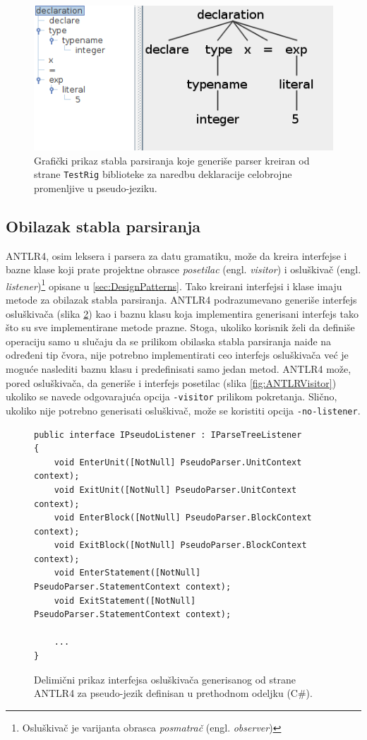 \begin{figure}[h!]
\centering
\includegraphics[scale=0.8]{images/pseudo_parse_tree.png}
\caption{Grafički prikaz stabla parsiranja koje generiše parser kreiran od strane \texttt{TestRig} biblioteke za naredbu deklaracije celobrojne promenljive u pseudo-jeziku.}
\label{fig:PseudoTreeGui}
\end{figure}


\subsection{Obilazak stabla parsiranja}
\label{subsec:ANTLRParserIntegration}

ANTLR4, osim leksera i parsera za datu gramatiku, može da kreira interfejse i bazne klase koji prate projektne obrasce \emph{posetilac} (engl. \emph{visitor}) i osluškivač (engl. \emph{listener})\footnote{Osluškivač je varijanta obrasca \emph{posmatrač} (engl. \emph{observer})} opisane u \ref{sec:DesignPatterns}. Tako kreirani interfejsi i klase imaju metode za obilazak stabla parsiranja. ANTLR4 podrazumevano generiše interfejs osluškivača (slika \ref{fig:ANTLRListener}) kao i baznu klasu koja implementira generisani interfejs tako što su sve implementirane metode prazne. Stoga, ukoliko korisnik želi da definiše operaciju samo u slučaju da se prilikom obilaska stabla parsiranja naiđe na određeni tip čvora, nije potrebno implementirati ceo interfejs osluškivača već je moguće naslediti baznu klasu i predefinisati samo jedan metod. ANTLR4 može, pored osluškivača, da generiše i interfejs posetilac (slika \ref{fig:ANTLRVisitor}) ukoliko se navede odgovarajuća opcija \texttt{-visitor} prilikom pokretanja. Slično, ukoliko nije potrebno generisati osluškivač, može se koristiti opcija \texttt{-no-listener}.

\begin{figure}[h!]
\begin{lstlisting}
public interface IPseudoListener : IParseTreeListener
{
    void EnterUnit([NotNull] PseudoParser.UnitContext context);
    void ExitUnit([NotNull] PseudoParser.UnitContext context);
    void EnterBlock([NotNull] PseudoParser.BlockContext context);
    void ExitBlock([NotNull] PseudoParser.BlockContext context);
    void EnterStatement([NotNull] PseudoParser.StatementContext context);
    void ExitStatement([NotNull] PseudoParser.StatementContext context);
    
    ...
}
\end{lstlisting}
\caption{Delimični prikaz interfejsa osluškivača generisanog od strane ANTLR4 za pseudo-jezik definisan u prethodnom odeljku (C\#).}
\label{fig:ANTLRListener}
\end{figure}

